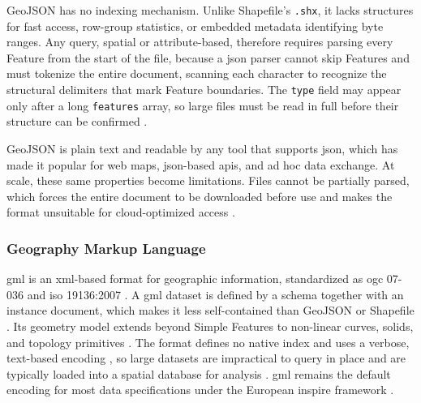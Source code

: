GeoJSON has no indexing mechanism. Unlike Shapefile's \texttt{.shx}, it lacks structures for fast access, row-group statistics, or embedded metadata identifying byte ranges. Any query, spatial or attribute-based, therefore requires parsing every Feature from the start of the file, because a \acrshort{json} parser cannot skip Features and must tokenize the entire document, scanning each character to recognize the structural delimiters that mark Feature boundaries. The \texttt{type} field may appear only after a long \texttt{features} array, so large files must be read in full before their structure can be confirmed \parencite{butler2016_rfc7946_geojson_format}.

GeoJSON is plain text and readable by any tool that supports \acrshort{json}, which has made it popular for web maps, \acrshort{json}-based \acrshort{api}s, and ad hoc data exchange. At scale, these same properties become limitations. Files cannot be partially parsed, which forces the entire document to be downloaded before use and makes the format unsuitable for cloud-optimized access \parencite{cngfoundation2024_cloud_optimized_geospatial_formats_guide}.

\subsubsection{Geography Markup Language}
\label{background:spatial-data-formats-and-storage-models:file-formats:geography-markup-language}
\acrfull{gml} is an \acrfull{xml}-based format for geographic information, standardized as \acrshort{ogc} 07-036 and \acrfull{iso} 19136:2007 \parencite{ogc2007_07036_gml_specification}. A \acrshort{gml} dataset is defined by a schema together with an instance document, which makes it less self-contained than GeoJSON or Shapefile \parencite{ogc2007_07036_gml_specification}. Its geometry model extends beyond Simple Features to non-linear curves, solids, and topology primitives \parencite{ogc2007_07036_gml_specification}. The format defines no native index \parencite{lu2005_advances_in_gml_geospatial_applications} and uses a verbose, text-based encoding \parencite{guo2010_effective_gml_documents_compressor}, so large datasets are impractical to query in place and are typically loaded into a spatial database for analysis \parencite{li2004_gml_storage_spatial_database}. \acrshort{gml} remains the default encoding for most data specifications under the European \acrfull{inspire} framework \parencite{ec2010_commission_regulation_1089_inspire, inspire2023_d27_encoding_guidelines}.

